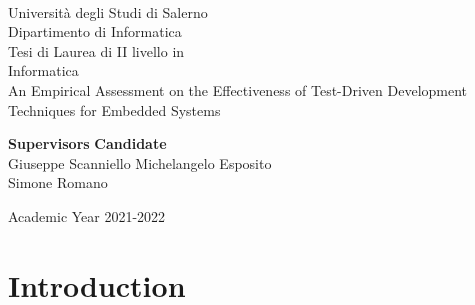 \documentclass[11pt, oneside]{book}
\begin{document}
    \begin{titlepage}
        \begin{center}
            \\[0.2truecm]
            {\Large Universit\`a degli Studi di Salerno}\\[0.2truecm]
            {\large Dipartimento di Informatica}\\
            \hrulefill
            \vfill
            {\large Tesi di Laurea di II livello in }\\[0.2truecm]
            {\Large Informatica}\\
            \vfill\vfill
            {\Huge An Empirical Assessment on the Effectiveness of Test-Driven Development Techniques for Embedded Systems}
            \vfill\vfill
            
            
            {\bf Supervisors} \hfill {\bf Candidate}\ \ \\
            Giuseppe Scanniello \hfill Michelangelo Esposito\\
            Simone Romano \hfill \ \ \\
            
            \vfill
            \hrulefill 
            
            Academic Year 2021-2022
        \end{center}
    \end{titlepage}


    
    
    \tableofcontents
    \pagestyle{plain}

    
    

    \chapter{Introduction}
    \setcounter{page}{1} 
    
    
    
    
    
    
    

    \nocite{*}
    \printbibliography[title={Bibliography}] 

    \appendix
    
    
    
    
    
\end{document}

